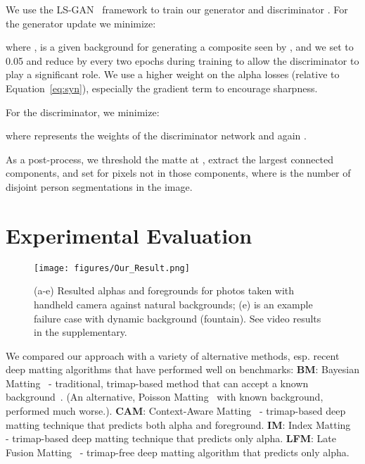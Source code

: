\documentclass[10pt,twocolumn,letterpaper]{article}
\begin{document}
We use the LS-GAN~\cite{mao2017least} framework to train our generator  and discriminator . For the generator update we minimize:
\vspace{-1mm}

where ,  is a given background for generating a composite seen by , and we set  to 0.05 and reduce by  every two epochs during training to allow the discriminator to play a significant role. We use a higher weight on the alpha losses (relative to Equation~\ref{eq:syn}), especially the gradient term to encourage sharpness. 

For the discriminator, we minimize:
\vspace{-1mm}

where  represents the weights of the discriminator network and again . 

As a post-process, we threshold the matte at , extract the largest  connected components, and set  for pixels not in those components, where  is the number of disjoint person segmentations in the image.








%
 \vspace{-0.5em}
\section{Experimental Evaluation}

\begin{figure*}
	\centering
	\texttt{[image: figures/Our\_Result.png]}    \vspace{-.2cm}
	\caption{\small (a-e) Resulted alphas and foregrounds for photos taken with handheld camera against natural backgrounds; (e) is an example failure case with dynamic background (fountain). See video results in the supplementary.} 
	\vspace{-1em}
	\label{fig:our_result}
\end{figure*}






\label{sec:baseline}

We compared our approach with a variety of alternative methods, esp. recent deep matting algorithms that have performed well on benchmarks: \textbf{BM}: Bayesian Matting~\cite{chuang2001bayesian} - traditional, trimap-based method that can accept a known background~\cite{chuang2002video}.  (An alternative, Poisson Matting~\cite{sun2004poisson,gong2009near} with known background, performed much worse.). \textbf{CAM}: Context-Aware Matting~\cite{hou2019context} - trimap-based deep matting technique that predicts both alpha and foreground. \textbf{IM}: Index Matting~\cite{lu2019indices} - trimap-based deep matting technique that predicts only alpha. \textbf{LFM}: Late Fusion Matting~\cite{zhang2019late} - trimap-free deep matting algorithm that predicts only alpha.
\end{document}
